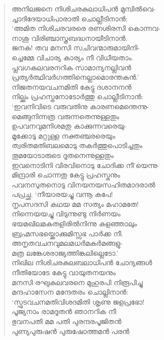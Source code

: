 \begin{verse}
അനിലജനെ നിശിചരകുലാധിപന്‍ മുമ്പില്‍വെ-\\
ച്ചാദിദേയാധിപാരാതി ചൊല്ലീടിനാന്‍:\\
‘അമിത നിശിചരവരരെ രണശിരസി കൊന്നവ-\\
നാശു വിരിഞ്ചാസ്ത്രബദ്ധനായീടിനാന്‍.\\
ജനക! തവ മനസി സചിവന്മാരുമായിനി-\\
ച്ചെമ്മേ വിചാര്യ കാര്യം നീ വിധീയതാം.\\
പ്ലവഗകുലവരനറിക സാമാന്യനല്ലിവന്‍\\
പ്രത്യര്‍ത്ഥിവര്‍ഗത്തിനെല്ലാമൊരന്തകന്‍.’\\
നിജതനയവചനമിതി കേട്ടു ദശാനനന്‍\\
നില്ക്കും പ്രഹസ്തനോടോര്‍ത്തു ചൊല്ലീടിനാന്‍:\\
‘ഇവനിവിടെ വരുവതിനു കാരണമെന്തെന്നു-\\
മെങ്ങുനിന്നത്ര വരുന്നതെന്നുള്ളതും\\
ഉപവനവുമനിശമതു കാക്കുന്നവരെയു-\\
മൂക്കോടു മറ്റുള്ള നക്തഞ്ചരരെയും\\
ത്വരിതമതിബലമൊടു തകര്‍ത്തുപൊടിച്ചതും\\
തൂമയോടാരുടെ ദൂതനെന്നുള്ളതും\\
ഇവനൊടിനി വിരവിനൊടു ചോദിക്ക നീ’യെന്നു-\\
മിന്ദ്രാരി ചൊന്നതു കേട്ടു പ്രഹസ്തനും\\
പവനസുതനൊടു വിനയനയസഹിതമാദരാല്‍\\
പപ്രച്ഛ, ‘നീയാരയച്ചു വന്നൂ കപേ!\\
നൃപസദസി കഥയ മമ സത്യം മഹാമതേ!\\
നിന്നെയയച്ചു വിടുന്നുണ്ടു നിര്‍ണയം\\
ഭയമഖിലമകതളിരില്‍നിന്നു കളഞ്ഞാലും\\
ബ്രഹ്മസഭയ്ക്കൊക്കുമിസ്സഭ പാര്‍ക്ക നീ.\\
അനൃതവചനവുമലമധര്‍മകര്‍മങ്ങളു-\\
മത്ര ലങ്കേശരാജ്യത്തിങ്കലില്ലെടോ.’\\
നിഖില നിശിചരകുലബലാധിപന്‍ ചോദ്യങ്ങള്‍\\
നീതിയോടേ കേട്ടു വായുതനയനും\\
മനസി രഘുകുലവരനെ മുഹുരപി നിരൂപിച്ചു\\
മന്ദഹാസേന മന്ദേതരം ചൊല്ലിനാന്‍:\\
‘സ്ഫുടവചനമതിവിശദമിതി ശൃണു ജളപ്രഭോ!\\
പൂജ്യനാം രാമദൂതന്‍ ഞാനറിക നീ\\
ഭുവനപതി മമ പതി പുരന്ദരപൂജിതന്‍\\
പുണ്യപുരുഷന്‍ പുരുഷോത്തമന്‍ പരന്‍\\

\end{verse}
